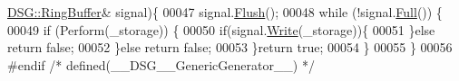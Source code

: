\begin{DoxyCode}
      \hyperlink{class_d_s_g_1_1_ring_buffer}{DSG::RingBuffer}& signal)\{
00047         signal.\hyperlink{class_d_s_g_1_1_ring_buffer_ab23c8003d2857809a816068eeb209d60}{Flush}();
00048         \textcolor{keywordflow}{while} (!signal.\hyperlink{class_d_s_g_1_1_ring_buffer_a53ddb04ffcbb5470a8d2b0a3c65b70cb}{Full}()) \{
00049             \textcolor{keywordflow}{if} (Perform(\_storage)) \{
00050                 \textcolor{keywordflow}{if}(signal.\hyperlink{class_d_s_g_1_1_ring_buffer_aa5dd2caa0a270173251faee40a43d692}{Write}(\_storage))\{
00051                 \}\textcolor{keywordflow}{else} \textcolor{keywordflow}{return} \textcolor{keyword}{false};
00052             \}\textcolor{keywordflow}{else} \textcolor{keywordflow}{return} \textcolor{keyword}{false};
00053         \}\textcolor{keywordflow}{return} \textcolor{keyword}{true};
00054     \}
00055 \}
00056 \textcolor{preprocessor}{#endif }\textcolor{comment}{/* defined(\_\_DSG\_\_GenericGenerator\_\_) */}\textcolor{preprocessor}{}
\end{DoxyCode}
